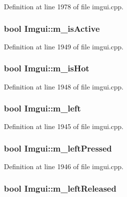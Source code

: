 Definition at line 1978 of file imgui.\+cpp.

\hypertarget{struct_imgui_a6eaf1b0dc223c0f6c8281aec73533ed3}{
\subsubsection[{m\+\_\+is\+Active}]{\setlength{\rightskip}{0pt plus 5cm}bool Imgui\+::m\+\_\+is\+Active}}\label{struct_imgui_a6eaf1b0dc223c0f6c8281aec73533ed3}


Definition at line 1949 of file imgui.\+cpp.

\hypertarget{struct_imgui_ad7bfdedfc25d70896a74b417113514b8}{
\subsubsection[{m\+\_\+is\+Hot}]{\setlength{\rightskip}{0pt plus 5cm}bool Imgui\+::m\+\_\+is\+Hot}}\label{struct_imgui_ad7bfdedfc25d70896a74b417113514b8}


Definition at line 1948 of file imgui.\+cpp.

\hypertarget{struct_imgui_af1c5e003ba01ccb02880f330c5f0eb9a}{
\subsubsection[{m\+\_\+left}]{\setlength{\rightskip}{0pt plus 5cm}bool Imgui\+::m\+\_\+left}}\label{struct_imgui_af1c5e003ba01ccb02880f330c5f0eb9a}


Definition at line 1945 of file imgui.\+cpp.

\hypertarget{struct_imgui_ae92c0cc43267ec19debdd74742b3bf77}{
\subsubsection[{m\+\_\+left\+Pressed}]{\setlength{\rightskip}{0pt plus 5cm}bool Imgui\+::m\+\_\+left\+Pressed}}\label{struct_imgui_ae92c0cc43267ec19debdd74742b3bf77}


Definition at line 1946 of file imgui.\+cpp.

\hypertarget{struct_imgui_a18c28b5938d175e28384fea64bf81d6e}{
\subsubsection[{m\+\_\+left\+Released}]{\setlength{\rightskip}{0pt plus 5cm}bool Imgui\+::m\+\_\+left\+Released}}\label{struct_imgui_a18c28b5938d175e28384fea64bf81d6e}


